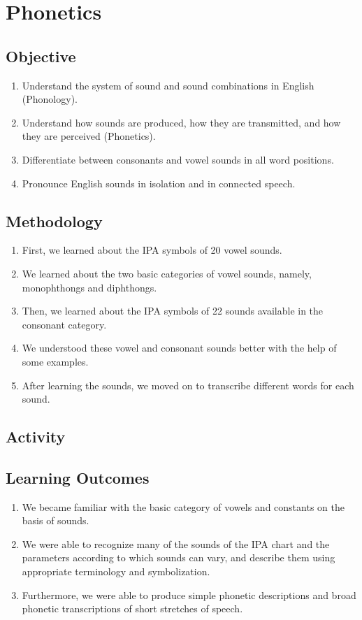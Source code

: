 \pagebreak

\section{Phonetics}

\subsection{Objective}
\begin{enumerate}
    \item Understand the system of sound and sound combinations in English (Phonology).
    \item Understand how sounds are produced, how they are transmitted, and how they are
          perceived (Phonetics).
    \item Differentiate between consonants and vowel sounds in all word positions.
    \item Pronounce English sounds in isolation and in connected speech.
\end{enumerate}

\subsection{Methodology}
\begin{enumerate}
    \item First, we learned about the IPA symbols of 20 vowel sounds.
    \item We learned about the two basic categories of vowel sounds, namely, monophthongs
          and diphthongs.
    \item Then, we learned about the IPA symbols of 22 sounds available in the consonant
          category.
    \item We understood these vowel and consonant sounds better with the help of some
          examples.
    \item After learning the sounds, we moved on to transcribe different words for each sound.
\end{enumerate}

\subsection{Activity}

\subsection{Learning Outcomes}
\begin{enumerate}
    \item We became familiar with the basic category of vowels and constants on the basis of
          sounds.
    \item We were able to recognize many of the sounds of the IPA chart and the parameters
          according to which sounds can vary, and describe them using appropriate terminology
          and symbolization.
    \item Furthermore, we were able to produce simple phonetic descriptions and broad phonetic
          transcriptions of short stretches of speech.
\end{enumerate}
\pagebreak

